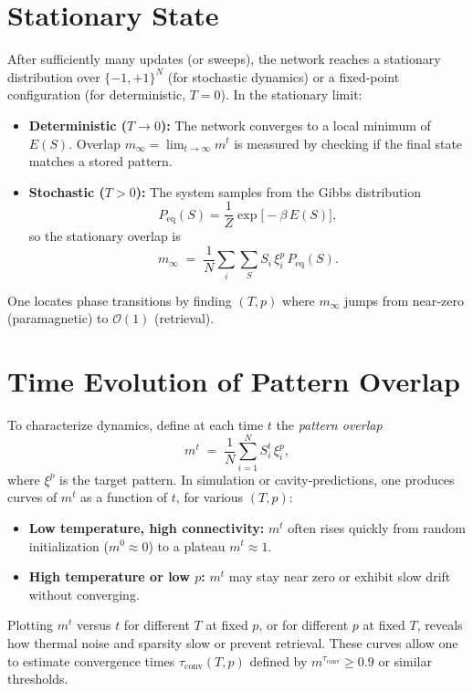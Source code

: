 \documentclass{article}
\begin{document}
\section{Stationary State}
After sufficiently many updates (or sweeps), the network reaches a stationary distribution over $\{ -1, +1\}^N$ (for stochastic dynamics) or a fixed‐point configuration (for deterministic, $T=0$).  In the stationary limit:
\begin{itemize}
    \item \textbf{Deterministic ($T\to 0$):}  The network converges to a local minimum of $E(S)$.  Overlap $m_\infty = \lim_{t\to\infty} m^t$ is measured by checking if the final state matches a stored pattern.
    \item \textbf{Stochastic ($T>0$):}  The system samples from the Gibbs distribution 
    \[
      P_{\mathrm{eq}}(S) 
      = \frac{1}{Z} \exp\bigl[-\beta\,E(S)\bigr],
    \]
    so the stationary overlap is 
    \[
      m_\infty \;=\; \frac{1}{N}\sum_{i}\sum_{S} S_i\,\xi_i^p\,P_{\mathrm{eq}}(S).
    \]
\end{itemize}
One locates phase transitions by finding $(T,p)$ where $m_\infty$ jumps from near‐zero (paramagnetic) to $\mathcal{O}(1)$ (retrieval).

\section{Time Evolution of Pattern Overlap}
To characterize dynamics, define at each time $t$ the \emph{pattern overlap}
\[
m^t
\;=\;
\frac{1}{N} \sum_{i=1}^{N} S_i^t \,\xi_i^p,
\]
where $\xi^p$ is the target pattern.  In simulation or cavity‐predictions, one produces curves of $m^t$ as a function of $t$, for various $(T,p)$:
\begin{itemize}
    \item \textbf{Low temperature, high connectivity:}  $m^t$ often rises quickly from random initialization ($m^0\approx 0$) to a plateau $m^t\approx 1$.
    \item \textbf{High temperature or low $p$:}  $m^t$ may stay near zero or exhibit slow drift without converging.
\end{itemize}
Plotting $m^t$ versus $t$ for different $T$ at fixed $p$, or for different $p$ at fixed $T$, reveals how thermal noise and sparsity slow or prevent retrieval.  These curves allow one to estimate convergence times $\tau_{\mathrm{conv}}(T,p)$ defined by $m^{\tau_{\mathrm{conv}}} \ge 0.9$ or similar thresholds.
\end{document}
